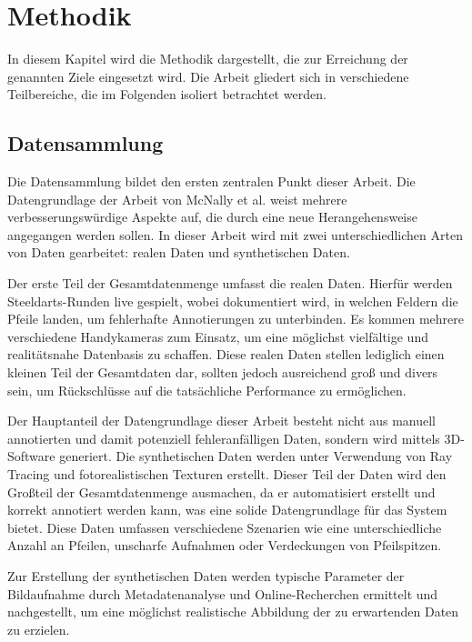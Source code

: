 \section{Methodik}
\label{sec:methodik}

In diesem Kapitel wird die Methodik dargestellt, die zur Erreichung der genannten Ziele eingesetzt wird. Die Arbeit gliedert sich in verschiedene Teilbereiche, die im Folgenden isoliert betrachtet werden.

\subsection{Datensammlung}
\label{sec:methodik:datensammlung}

Die Datensammlung bildet den ersten zentralen Punkt dieser Arbeit. Die Datengrundlage der Arbeit von McNally et al. weist mehrere verbesserungswürdige Aspekte auf, die durch eine neue Herangehensweise angegangen werden sollen. In dieser Arbeit wird mit zwei unterschiedlichen Arten von Daten gearbeitet: realen Daten und synthetischen Daten.

Der erste Teil der Gesamtdatenmenge umfasst die realen Daten. Hierfür werden Steeldarts-Runden live gespielt, wobei dokumentiert wird, in welchen Feldern die Pfeile landen, um fehlerhafte Annotierungen zu unterbinden. Es kommen mehrere verschiedene Handykameras zum Einsatz, um eine möglichst vielfältige und realitätsnahe Datenbasis zu schaffen. Diese realen Daten stellen lediglich einen kleinen Teil der Gesamtdaten dar, sollten jedoch ausreichend groß und divers sein, um Rückschlüsse auf die tatsächliche Performance zu ermöglichen.

Der Hauptanteil der Datengrundlage dieser Arbeit besteht nicht aus manuell annotierten und damit potenziell fehleranfälligen Daten, sondern wird mittels 3D-Software generiert. Die synthetischen Daten werden unter Verwendung von Ray Tracing und fotorealistischen Texturen erstellt. Dieser Teil der Daten wird den Großteil der Gesamtdatenmenge ausmachen, da er automatisiert erstellt und korrekt annotiert werden kann, was eine solide Datengrundlage für das System bietet. Diese Daten umfassen verschiedene Szenarien wie eine unterschiedliche Anzahl an Pfeilen, unscharfe Aufnahmen oder Verdeckungen von Pfeilspitzen.

Zur Erstellung der synthetischen Daten werden typische Parameter der Bildaufnahme durch Metadatenanalyse und Online-Recherchen ermittelt und nachgestellt, um eine möglichst realistische Abbildung der zu erwartenden Daten zu erzielen.

